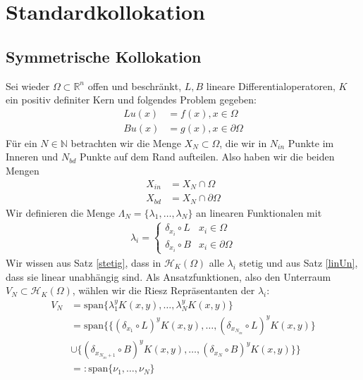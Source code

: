 \chapter{Standardkollokation}
\label{cha:Standardkollokation}

\section{Symmetrische Kollokation}
\label{sec:SymKol}
Sei wieder $\Omega \subset \mathbb{R}^n$ offen und beschränkt, $L,B$ lineare Differentialoperatoren, $K$ ein positiv definiter Kern und folgendes Problem gegeben:
\begin{align*}
L u(x) &= f(x), x \in \Omega \\
B u(x) &= g(x), x \in \partial \Omega
\end{align*}
Für ein $N \in \mathbb{N}$ betrachten wir die Menge $X_N \subset \Omega$, die wir in $N_{in}$ Punkte im Inneren und $N_{bd}$ Punkte auf dem Rand aufteilen. Also haben wir die beiden Mengen
\begin{align*}
X_{in} &= X_N \cap \Omega\\
X_{bd} &= X_N \cap \partial \Omega
\end{align*}
Wir definieren die Menge $\Lambda_N = \{\lambda_1, \dots, \lambda_N\}$ an linearen Funktionalen mit
\begin{align*}
\lambda_i =
\begin{cases}
\delta_{x_i} \circ L & x_i \in \Omega\\
\delta_{x_i} \circ B & x_i \in \partial \Omega
\end{cases}
\end{align*}
Wir wissen aus Satz \ref{stetig}, dass in $\mathcal{H}_K(\Omega)$ alle $\lambda_i$ stetig und aus Satz \ref{linUn}, dass sie linear unabhängig sind. Als Ansatzfunktionen, also den Unterraum $V_N \subset \mathcal{H}_K(\Omega)$, wählen wir die Riesz Repräsentanten der $\lambda_i$:
\begin{align*}
V_N &= \text{span} \{\lambda_1^y K(x,y), \dots , \lambda_N^y K(x,y)\}\\
&= \text{span} \{\{(\delta_{x_1} \circ L)^y K(x,y), \dots, (\delta_{x_{N_{in}}} \circ L)^y K(x,y)\}\\
&\cup \{ (\delta_{x_{N_{in} + 1}} \circ B)^y K(x,y), \dots, (\delta_{x_{N}} \circ B)^y K(x,y)\}\}\\
&=: \text{span} \{\nu_1, \dots, \nu_N\}
\end{align*}

